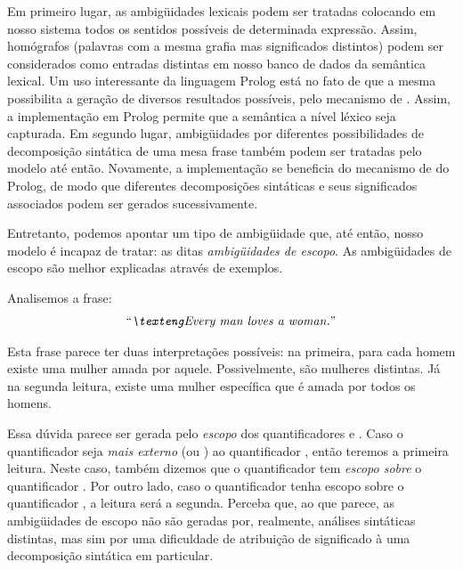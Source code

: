 Em primeiro lugar, as ambigüidades lexicais podem ser tratadas colocando em nosso sistema todos os sentidos possíveis de determinada expressão. Assim, homógrafos (palavras com a mesma grafia mas significados distintos) podem ser considerados como entradas distintas em nosso banco de dados da semântica lexical. Um uso interessante da linguagem Prolog está no fato de que a mesma possibilita a geração de diversos resultados possíveis, pelo mecanismo de . Assim, a implementação em Prolog permite que a semântica a nível léxico seja capturada. Em segundo lugar, ambigüidades por diferentes possibilidades de decomposição sintática de uma mesa frase também podem ser tratadas pelo modelo até então. Novamente, a implementação se beneficia do mecanismo de  do Prolog, de modo que diferentes decomposições sintáticas e seus significados associados podem ser gerados sucessivamente.

Entretanto, podemos apontar um tipo de ambigüidade que, até então, nosso modelo é incapaz de tratar: as ditas \textit{ambigüidades de escopo}. \cite[p.~105-109]{BlackburnBos:2005} As ambigüidades de escopo são melhor explicadas através de exemplos.

Analisemos a frase: 
\begin{align*}
\text{\expreng{Every man loves a woman.}}
\end{align*}%

Esta frase parece ter duas interpretações possíveis: na primeira, para cada homem existe uma mulher amada por aquele. Possivelmente, são mulheres distintas. Já na segunda leitura, existe uma mulher específica que é amada por todos os homens.

Essa dúvida parece ser gerada pelo \textit{escopo} dos quantificadores  e . Caso o quantificador  seja \textit{mais externo} (ou \textit{}) ao quantificador , então teremos a primeira leitura. Neste caso, também dizemos que o quantificador  tem \textit{escopo sobre} o quantificador . Por outro lado, caso o quantificador  tenha escopo sobre o quantificador , a leitura será a segunda. Perceba que, ao que parece, as ambigüidades de escopo não são geradas por, realmente, análises sintáticas distintas, mas sim por uma dificuldade de atribuição de significado à uma decomposição sintática em particular.

